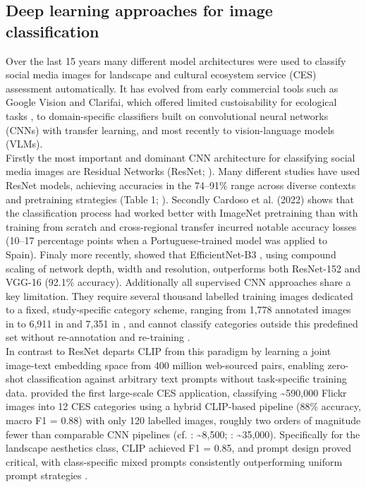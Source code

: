 \documentclass[hidelinks, 11pt]{article}
\begin{document}
\subsection{Deep learning approaches for image classification}

Over the last 15 years many different model architectures were used to classify social media images for landscape and cultural ecosystem service (CES) assessment automatically. It has evolved from early commercial tools such as Google Vision and Clarifai, which offered limited custoisability for ecological tasks \citep{lingua_valuing_2022,winder_open-source_2022}, to domain-specific classifiers built on convolutional neural networks (CNNs) with transfer learning, and most recently to vision-language models (VLMs).
\\
Firstly the most important and dominant CNN architecture for classifying social media images are Residual Networks (ResNet; \citealt{he_deep_2016}). Many different studies have used ResNet models, achieving accuracies in the 74–91\% range across diverse contexts and pretraining strategies (Table 1; \citealt{cardoso_classifying_2022,lingua_valuing_2022,comalada_modelling_2025,xu_revealing_2025,you_mapping_2026}). Secondly Cardoso et al. (2022) shows that the classification process had worked better with ImageNet pretraining than with training from scratch and cross-regional transfer incurred notable accuracy losses (10--17 percentage points when a Portuguese-trained model was applied to Spain). Finaly more recently, \citet{chen_using_2025} showed that EfficientNet-B3 \citep{tan_efficientnet_2019}, using compound scaling of network depth, width and resolution, outperforms both ResNet-152 and VGG-16 (92.1\% accuracy). Additionally all supervised CNN approaches share a key limitation. They require several thousand labelled training images dedicated to a fixed, study-specific category scheme, ranging from 1,778 annotated images in \citet{cardoso_classifying_2022} to 6,911 in \citet{comalada_modelling_2025} and 7,351 in \citet{you_mapping_2026}, and cannot classify categories outside this predefined set without re-annotation and re-training \citep{radford_learning_2021}.
\\
In contrast to ResNet departs CLIP \citep{radford_learning_2021} from this paradigm by learning a joint image-text embedding space from 400 million web-sourced pairs, enabling zero-shot classification against arbitrary text prompts without task-specific training data. \citet{liao_mapping_2025} provided the first large-scale CES application, classifying \textasciitilde590,000 Flickr images into 12 CES categories using a hybrid CLIP-based pipeline (88\% accuracy, macro F1 = 0.88) with only 120 labelled images, roughly two orders of magnitude fewer than comparable CNN pipelines (cf. \citealt{cardoso_classifying_2022}: \textasciitilde8,500; \citealt{lingua_valuing_2022}: \textasciitilde35,000). Specifically for the landscape aesthetics class, CLIP achieved F1 = 0.85, and prompt design proved critical, with class-specific mixed prompts consistently outperforming uniform prompt strategies \citep{liao_mapping_2025}.
\end{document}
